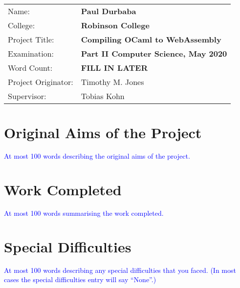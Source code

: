\documentclass[12pt,twoside,notitlepage]{report}
\newcommand\note[1]{\textcolor{blue}{#1}}
\begin{document}
{\large
	\begin{tabular}{ll}
		Name:               & \bf Paul Durbaba                       \\
		College:            & \bf Robinson College                     \\
		Project Title:      & \bf Compiling OCaml to WebAssembly \\
		Examination:        & \bf Part II Computer Science, May 2020        \\
		Word Count:         & \bf FILL IN LATER  \\
		Project Originator: & Timothy M. Jones                \\
		Supervisor:         & Tobias Kohn            \\ 
	\end{tabular}
}


\section*{Original Aims of the Project}

\note{At most 100 words describing the original aims of the project.}


\section*{Work Completed}

\note{At most 100 words summarising the work completed.}

\section*{Special Difficulties}

\note{At most 100 words describing any special difficulties that you faced.
(In most cases the special difficulties entry will say “None”.) }

\tableofcontents

\listoffigures


\clearpage        %

\setcounter{page}{1}
\pagestyle{headings}
\end{document}
